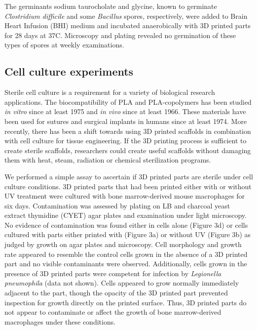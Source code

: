 \begin{refsection}
The germinants sodium taurocholate and glycine, known to germinate
{\em Clostridium difficile} and some {\em Bacillus} spores,
respectively, \cite{spores, spore_germinant_salt} were added to Brain
Heart Infusion (BHI) medium and incubated anaerobically with 3D
printed parts for 28 days at 37C.  Microscopy and plating revealed no
germination of these types of spores at weekly examinations.

\subsection{Cell culture experiments}

Sterile cell culture is a requirement for a variety of biological
research applications. The biocompatibility of PLA and PLA-copolymers
has been studied {\em in vitro} since at least 1975 \cite{PLA_1975}
and {\em in vivo} since at least 1966. \cite{PLA_1966} These materials
have been used for sutures and surgical implants in humans since at
least 1974. \cite{Vicryl} More recently, there has been a shift
towards using 3D printed scaffolds in combination with cell culture
for tissue engineering. \cite{bone_printing} If the 3D printing
process is sufficient to create sterile scaffolds, researchers could
create useful scaffolds without damaging them with heat, steam,
radiation or chemical sterilization programs.

We performed a simple assay to ascertain if 3D printed parts are
sterile under cell culture conditions. 3D printed parts that had been
printed either with or without UV treatment were cultured with bone
marrow-derived mouse macrophages for six days. Contamination was
assessed by plating on LB and charcoal yeast extract thymidine (CYET)
agar plates and examination under light microscopy.  No evidence of
contamination was found either in cells alone (Figure 3d) or cells
cultured with parts either printed with (Figure 3a) or without UV
(Figure 3b) as judged by growth on agar plates and microscopy. Cell
morphology and growth rate appeared to resemble the control cells
grown in the absence of a 3D printed part and no visible contaminants
were observed. Additionally, cells grown in the presence of 3D printed
parts were competent for infection by {\em Legionella pneumophila}
(data not shown). Cells appeared to grow normally immediately adjacent
to the part, though the opacity of the 3D printed part prevented
inspection for growth directly on the printed surface. Thus, 3D
printed parts do not appear to contaminate or affect the growth of
bone marrow-derived macrophages under these conditions.


\end{refsection}
